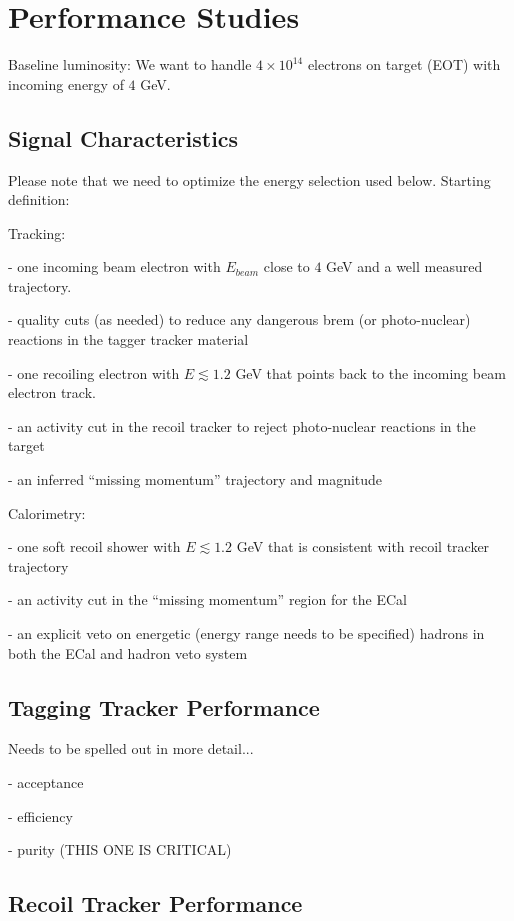 \section{Performance Studies}

Baseline luminosity:  We want to handle $4\times 10^{14}$ electrons on target (EOT) with incoming energy of $4$ GeV. 

\subsection{Signal Characteristics}

Please note that we need to optimize the energy selection used below. Starting definition: 

Tracking: 

- one incoming beam electron with $E_{beam}$ close to $4$ GeV and a well measured trajectory. 
 
- quality cuts (as needed) to reduce any dangerous brem (or photo-nuclear) reactions in the tagger tracker material
 
- one recoiling electron with $E\lesssim 1.2$ GeV that points back to the incoming beam electron track. 

- an activity cut in the recoil tracker to reject photo-nuclear reactions in the target

- an inferred ``missing momentum'' trajectory and magnitude 

Calorimetry: 

- one soft recoil shower with $E\lesssim 1.2$ GeV that is consistent with recoil tracker trajectory

- an activity cut in the ``missing momentum'' region for the ECal

- an explicit veto on energetic (energy range needs to be specified) hadrons in both the ECal and hadron veto system 

\subsection{Tagging Tracker Performance}

Needs to be spelled out in more detail...

- acceptance

- efficiency 

- purity (THIS ONE IS CRITICAL)

\subsection{Recoil Tracker Performance}

